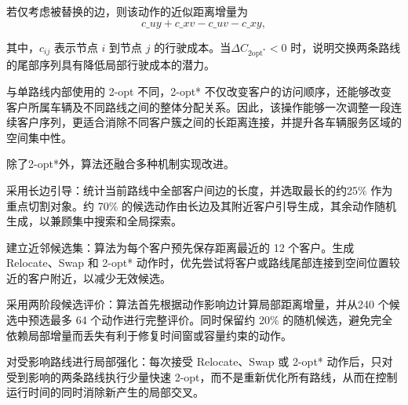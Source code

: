\documentclass[12pt,a4paper,UTF8]{article}
\begin{document}
若仅考虑被替换的边，则该动作的近似距离增量为
\begin{equation}
c\_{uy}+c\_{xv}-c\_{uv}-c\_{xy},
\label{eq}
\end{equation}

其中，$c_{ij}$ 表示节点 $i$ 到节点 $j$ 的行驶成本。当$\Delta C_{\mathrm{2opt^*}}<0$ 时，说明交换两条路线的尾部序列具有降低局部行驶成本的潜力。

与单路线内部使用的 2-opt 不同，2-opt* 不仅改变客户的访问顺序，还能够改变客户所属车辆及不同路线之间的整体分配关系。因此，该操作能够一次调整一段连续客户序列，更适合消除不同客户簇之间的长距离连接，并提升各车辆服务区域的空间集中性。

除了2-opt*外，算法还融合多种机制实现改进。

采用长边引导：统计当前路线中全部客户间边的长度，并选取最长的约25\% 作为重点切割对象。约 70\% 的候选动作由长边及其附近客户引导生成，其余动作随机生成，以兼顾集中搜索和全局探索。

建立近邻候选集：算法为每个客户预先保存距离最近的 12 个客户。生成Relocate、Swap 和 2-opt* 动作时，优先尝试将客户或路线尾部连接到空间位置较近的客户附近，以减少无效候选。

采用两阶段候选评价：算法首先根据动作影响边计算局部距离增量，并从240 个候选中预选最多 64 个动作进行完整评价。同时保留约 20\% 的随机候选，避免完全依赖局部增量而丢失有利于修复时间窗或容量约束的动作。

对受影响路线进行局部强化：每次接受 Relocate、Swap 或 2-opt* 动作后，只对受到影响的两条路线执行少量快速 2-opt，而不是重新优化所有路线，从而在控制运行时间的同时消除新产生的局部交叉。
\end{document}
